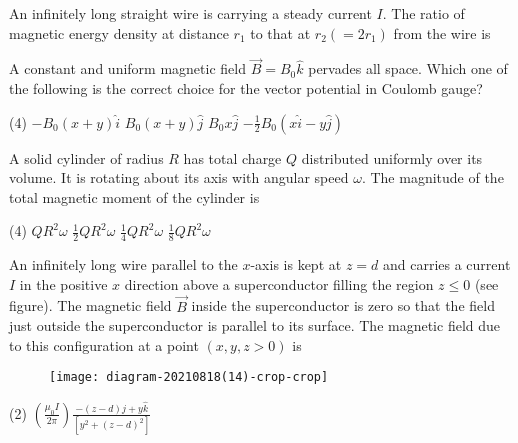 \begin{enumerate}
\begin{minipage}{\textwidth}
	\item An infinitely long straight wire is carrying a steady current $I$. The ratio of magnetic energy density at distance $r_{1}$ to that at $r_{2}\left(=2 r_{1}\right)$ from the wire is
\end{minipage}
\begin{minipage}{\textwidth}
	\item A constant and uniform magnetic field $\vec{B}=B_{0} \hat{k}$ pervades all space. Which one of the following is the correct choice for the vector potential in Coulomb gauge?
\end{minipage}
\begin{tasks}(4)
	\task[\textbf{A.}] $-B_{0}(x+y) \hat{i}$
	\task[\textbf{B.}]$B_{0}(x+y) \hat{j}$
	\task[\textbf{C.}] $B_{0} x \hat{j}$
	\task[\textbf{D.}]$-\frac{1}{2} B_{0}(x \hat{i}-y \hat{j})$
\end{tasks}
\begin{minipage}{\textwidth}
	\item  A solid cylinder of radius $R$ has total charge $Q$ distributed uniformly over its volume. It is rotating about its axis with angular speed $\omega$. The magnitude of the total magnetic moment of the cylinder is
\end{minipage}
\begin{tasks}(4)
	\task[\textbf{A.}] $Q R^{2} \omega$
	\task[\textbf{B.}]$\frac{1}{2} Q R^{2} \omega$
	\task[\textbf{C.}]$\frac{1}{4} Q R^{2} \omega$
	\task[\textbf{D.}]$\frac{1}{8} Q R^{2} \omega$
\end{tasks}
\begin{minipage}{\textwidth}
	\item An infinitely long wire parallel to the $x$-axis is kept at $z=d$ and carries a current $I$ in the positive $x$ direction above a superconductor filling the region $z \leq 0$ (see figure). The magnetic field $\vec{B}$ inside the superconductor is zero so that the field just outside the superconductor is parallel to its surface. The magnetic field due to this configuration at a point $(x, y, z>0)$ is
	\begin{figure}[H]
		\centering
		\texttt{[image: diagram-20210818(14)-crop-crop]}
		\caption{}
		\label{}
	\end{figure}
\end{minipage}
\begin{tasks}(2)
	\task[\textbf{A.}]$\left(\frac{\mu_{0} I}{2 \pi}\right) \frac{-(z-d) \hat{j}+y \hat{k}}{\left[y^{2}+(z-d)^{2}\right]}$

\end{tasks}
\end{enumerate}
